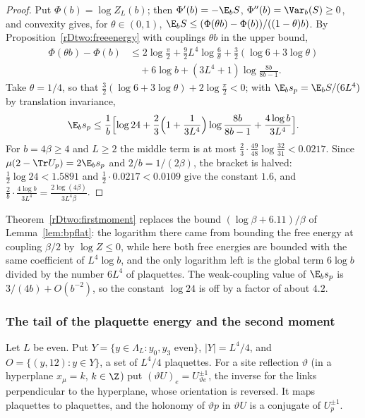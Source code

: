 \begin{proof}
Put $\Phi(b)=\log Z_L(b)$; then $\Phi'(b)=-\E_bS$, $\Phi''(b)=\Var_b(S)\ge0$,
and convexity gives, for $\theta\in(0,1)$, $\E_bS\le(\Phi(\theta b)-\Phi(b))/
((1-\theta)b)$. By Proposition~\ref{rDtwo:freeenergy} with couplings
$\theta b$ in the upper bound,
\[
\begin{split}
\Phi(\theta b)-\Phi(b)&\le2\log\tfrac\pi2+\tfrac92L^4\log\tfrac6\theta+\tfrac32
(\log6+3\log\theta)\\
&\quad+6\log b+(3L^4+1)\log\frac{8b}{8b-1}.
\end{split}
\]
Take $\theta=1/4$, so that $\frac32(\log6+3\log\theta)+2\log\frac\pi2<0$;
with $\E_bs_p=\E_bS/(6L^4)$ by translation invariance,
\[
\E_bs_p\le\frac1b\Bigl[\log24+\frac23\Bigl(1+\frac1{3L^4}\Bigr)\log\frac{8b}
{8b-1}+\frac{4\log b}{3L^4}\Bigr].
\]
For $b=4\beta\ge4$ and $L\ge2$ the middle term is at most $\frac23\cdot\frac
{49}{48}\log\frac{32}{31}<0.0217$. Since $\mu(2-\Tr U_p)=2\E_bs_p$ and $2/b
=1/(2\beta)$, the bracket is halved: $\frac12\log24<1.5891$ and $\frac12
\cdot0.0217<0.0109$ give the constant $1.6$, and $\frac{2}{b}\cdot\frac
{4\log b}{3L^4}=\frac{2\log(4\beta)}{3L^4\beta}$.
\end{proof}

Theorem~\ref{rDtwo:firstmoment} replaces the bound $(\log\beta+6.11)/\beta$
of Lemma~\ref{lem:bpflat}: the logarithm there came from bounding the free
energy at coupling $\beta/2$ by $\log Z\le0$, while here both free energies
are bounded with the same coefficient of $L^4\log b$, and the only logarithm
left is the global term $6\log b$ divided by the number $6L^4$ of
plaquettes. The weak-coupling value of $\E_bs_p$ is $3/(4b)+O(b^{-2})$, so
the constant $\log24$ is off by a factor of about $4.2$.

\subsubsection{The tail of the plaquette energy and the second moment}

Let $L$ be even. Put $Y=\{y\in\Lambda_L:y_0,y_3\text{ even}\}$, $\lvert Y
\rvert=L^4/4$, and $O=\{(y,12):y\in Y\}$, a set of $L^4/4$ plaquettes. For a
site reflection $\vartheta$ (in a hyperplane $x_\mu=k$, $k\in\Z$) put
$(\vartheta U)_e=U_{\vartheta e}^{\pm1}$, the inverse for the links
perpendicular to the hyperplane, whose orientation is reversed. It maps
plaquettes to plaquettes, and the holonomy of $\vartheta p$ in $\vartheta U$
is a conjugate of $U_p^{\pm1}$.

